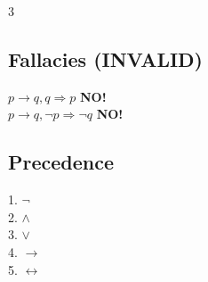 \documentclass[8pt,a4paper]{article}
\begin{document}
\begin{multicols}{3}
\subsection*{Fallacies (INVALID)}
$p \to q, q \Rightarrow p$ \textbf{NO!}\\
$p \to q, \neg p \Rightarrow \neg q$ \textbf{NO!}

\subsection*{Precedence}
1. $\neg$\\
2. $\land$\\
3. $\lor$\\
4. $\to$\\
5. $\leftrightarrow$

\end{multicols}
\end{document}
